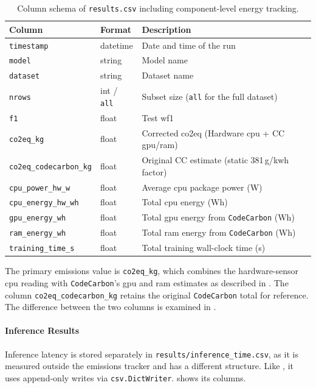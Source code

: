 \begin{table}[htbp]
\centering
\small
\caption[Column schema of \texttt{results.csv}.]{Column schema of \texttt{results.csv} including component-level energy tracking.}
\label{tab:results_schema}
\begin{tabular}{lll}
\toprule
\textbf{Column} & \textbf{Format} & \textbf{Description} \\
\midrule
\texttt{timestamp}             & datetime & Date and time of the run \\
\texttt{model}                 & string   & Model name \\
\texttt{dataset}               & string   & Dataset name \\
\texttt{nrows}                 & int / \texttt{all} & Subset size (\texttt{all} for the full dataset) \\
\texttt{f1}                    & float    & Test \gls{wf1} \\
\texttt{co2eq\_kg}             & float    & Corrected \gls{co2eq} (Hardware \gls{cpu} + CC \gls{gpu}/\gls{ram}) \\
\texttt{co2eq\_codecarbon\_kg} & float    & Original CC estimate (static 381\,g/\gls{kwh} factor) \\
\texttt{cpu\_power\_hw\_w}     & float    & Average \gls{cpu} package power (W) \\
\texttt{cpu\_energy\_hw\_wh}   & float    & Total \gls{cpu} energy (Wh) \\
\texttt{gpu\_energy\_wh}       & float    & Total \gls{gpu} energy from \texttt{CodeCarbon} (Wh) \\
\texttt{ram\_energy\_wh}       & float    & Total \gls{ram} energy from \texttt{CodeCarbon} (Wh) \\
\texttt{training\_time\_s}     & float    & Total training wall-clock time (s) \\
\bottomrule
\end{tabular}
\end{table}

The primary emissions value is \texttt{co2eq\_kg}, which combines the hardware-sensor \gls{cpu} reading with \texttt{CodeCarbon}'s \gls{gpu} and \gls{ram} estimates as described in . The column \texttt{co2eq\_codecarbon\_kg} retains the original \texttt{CodeCarbon} total for reference. The difference between the two columns is examined in .

\paragraph{Inference Results}
Inference latency is stored separately in \texttt{results/inference\_time.csv}, as it is measured outside the emissions tracker and has a different structure. Like , it uses append-only writes via \texttt{csv.DictWriter}.  shows its columns.

